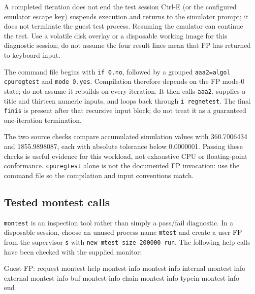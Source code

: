 \begin{operationnote}{A completed iteration does not end the test session}
Ctrl-E (or the configured emulator escape key) suspends execution and returns to the simulator prompt; it does not terminate the guest test process. Resuming the emulator can continue the test. Use a volatile disk overlay or a disposable working image for this diagnostic session; do not assume the four result lines mean that FP has returned to keyboard input.
\end{operationnote}

The command file begins with \passthrough{\lstinline!if 0.no!}, followed by a grouped \passthrough{\lstinline!aaa2=algol cpuregtest!} and \passthrough{\lstinline!mode 0.yes!}. Compilation therefore depends on the FP mode-0 state; do not assume it rebuilds on every iteration. It then calls \passthrough{\lstinline!aaa2!}, supplies a title and thirteen numeric inputs, and loops back through \passthrough{\lstinline!i regnetest!}. The final \passthrough{\lstinline!finis!} is present after that recursive input block; do not treat it as a guaranteed one-iteration termination.

The two source checks compare accumulated simulation values with 360.7006434 and 1855.9898087, each with absolute tolerance below 0.0000001. Passing these checks is useful evidence for this workload, not exhaustive CPU or floating-point conformance. \passthrough{\lstinline!cpuregtest!} alone is not the documented FP invocation: use the command file so the compilation and input conventions match.

\subsection{Tested montest calls}\label{tested-montest-calls}

\passthrough{\lstinline!montest!} is an inspection tool rather than simply a pass/fail diagnostic. In a disposable session, choose an unused process name \passthrough{\lstinline!mtest!} and create a user FP from the supervisor \passthrough{\lstinline!s!} with \passthrough{\lstinline!new mtest size 200000 run!}. The following help calls have been checked with the supplied monitor:

\begin{commandexample}{Guest FP: request montest help}
montest info
montest info internal
montest info external
montest info buf
montest info chain
montest info typein
montest info end
\end{commandexample}


